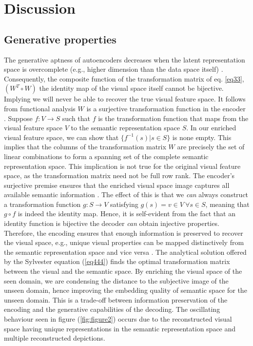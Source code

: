 \documentclass{article}
\begin{document}
\section{Discussion}

\subsection{Generative properties}
The generative aptness of autoencoders decreases when the latent representation space is overcomplete (e.g., higher dimension than the data space itself) \cite{b71}. Consequently, the composite function of the transformation matrix of eq. \ref{eq33}, $(W^T\circ W)$ the identity map of the visual space itself cannot be bijective. Implying we will never be able to recover the true visual feature space. It follows from functional analysis $W$ is a surjective transformation function in the encoder \cite{b51}. Suppose $f: V \rightarrow S$ such that $f$ is the transformation function that maps from the visual feature space $V$ to the semantic representation space $S$. In our enriched visual feature space, we can show that $\{f^{-1}(s)|s\in S\}$ is none empty. This implies that the columns of the transformation matrix $W$ are precisely the set of linear combinations to form a spanning set of the complete semantic representation space. This implication is not true for the original visual feature space, as the transformation matrix need not be full row rank. The encoder's surjective premise ensures that the enriched visual space image captures all available semantic information \cite{b51}. The effect of this is that we \textit{can} always construct a transformation function $g: S \rightarrow V$ satisfying $g(s)=v \in V~\forall s \in S$, meaning that $g \circ f$ is indeed the identity map. Hence, it is self-evident from the fact that an identity function is bijective \cite{b72} the decoder \textit{can} obtain injective properties. Therefore, the encoding ensures that enough information is preserved to recover the visual space, e.g., unique visual properties can be mapped distinctively from the semantic representation space and vice versa \cite{b52}. 
The analytical solution offered by the Sylvester equation (\ref{eq444}) finds the optimal transformation matrix between the visual and the semantic space. By enriching the visual space of the seen domain, we are condensing the distance to the subjective image of the unseen domain, hence improving the embedding quality of semantic space for the unseen domain.
This is a trade-off between information preservation of the encoding and the generative capabilities of the decoding. The oscillating behaviour seen in figure (\ref{fig:figure2}) occurs due to the reconstructed visual space having unique representations in the semantic representation space and multiple reconstructed depictions. 
\end{document}
